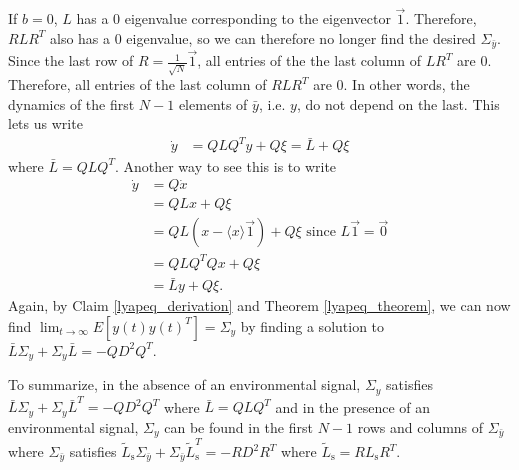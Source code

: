 \documentclass{article}
\begin{document}
If $b=0$, $L$ has a $0$ eigenvalue corresponding to the eigenvector $\vec{1}$. Therefore, $RLR^T$ also has a $0$ eigenvalue, so we can therefore no longer find the desired $\Sigma_{\bar{y}}$.  Since the last row of $R=\frac{1}{\sqrt{N}}\vec{1}$, all entries of the the last column of $LR^T$ are $0$. Therefore, all entries of the last column of $RLR^T$ are $0$. In other words, the dynamics of the first $N-1$ elements of $\bar{y}$, i.e. $y$, do not depend on the last. This lets us write 
\begin{align*}
\dot{y}&=QLQ^Ty+Q\xi=\bar{L}+Q\xi
\end{align*}
where $\bar{L}=QLQ^T$. Another way to see this is to write 
\begin{align*}
 \dot{y}&=Q\dot{x}
 \\ &=QLx+Q\xi
 \\&=QL(x-\langle x\rangle \vec{1})+Q\xi \text{ since $L\vec{1}=\vec{0}$}
 \\&=QLQ^TQx+Q\xi
 \\&=\bar{L}y+Q\xi.
\end{align*}
Again, by Claim \ref{lyapeq_derivation} and Theorem \ref{lyapeq_theorem}, we can now find $\lim_{t\to\infty}E[y(t)y(t)^T]=\Sigma_y$ by finding a solution to $\bar{L}\Sigma_y+\Sigma_y\bar{L}=-QD^2Q^T$. 

To summarize, in the absence of an environmental signal, $\Sigma_y$ satisfies $\bar{L}\Sigma_y+\Sigma_y\bar{L}^T=-QD^2Q^T$ where $\bar{L}=QLQ^T$ and in the presence of an environmental signal, $\Sigma_y$ can be found in the first $N-1$ rows and columns of $\Sigma_{\bar{y}}$ where $\Sigma_{\bar{y}}$ satisfies $\tilde{L}_\text{s}\Sigma_{\bar{y}}+\Sigma_{\bar{y}}\tilde{L}_\text{s}^T=-RD^2R^T$ where $\tilde{L}_\text{s}=RL_\text{s}R^T$.
\end{document}
